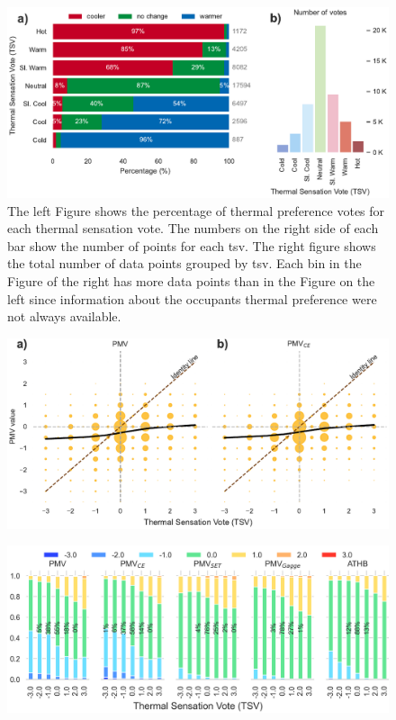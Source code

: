 \begin{figure}
    \centering
    \includegraphics[width=\textwidth]{figures/bar_plot_tp_by_ts}
    \caption{The left Figure shows the percentage of thermal preference votes for each thermal sensation vote.
    The numbers on the right side of each bar show the number of points for each \ac{tsv}.
    The right figure shows the total number of data points grouped by \ac{tsv}.
    Each bin in the Figure of the right has more data points than in the Figure on the left since information about the occupants thermal preference were not always available.}
    \label{fig:bar_plot_tp_by_ts}
\end{figure}

\begin{figure}
    \centering
    \includegraphics[width=\textwidth]{figures/bubble_models_vs_tsv}
    \caption{}
    \label{fig:bubble_models_vs_tsv}
\end{figure}

\begin{figure}
    \centering
    \includegraphics[width=\textwidth]{figures/bar_stacked_model_accuracy}
    \caption{}
    \label{fig:bar_stacked_model_accuracy}
\end{figure}

